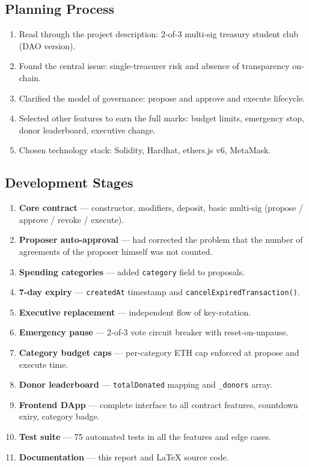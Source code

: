 \documentclass[12pt,a4paper]{article}
\begin{document}
\subsection{Planning Process}

\begin{enumerate}
  \item Read through the project description: 2-of-3 multi-sig treasury student club (DAO version).
  \item Found the central issue: single-treasurer risk and absence of transparency on-chain.
  \item Clarified the model of governance: propose and approve and execute lifecycle.
  \item Selected other features to earn the full marks: budget limits, emergency stop, donor leaderboard, executive change.
  \item Chosen technology stack: Solidity, Hardhat, ethers.js v6, MetaMask.
\end{enumerate}

\subsection{Development Stages}

\begin{enumerate}
  \item \textbf{Core contract} — constructor, modifiers, deposit, basic multi-sig (propose / approve / revoke / execute).
  \item \textbf{Proposer auto-approval} — had corrected the problem that the number of agreements of the proposer himself was not counted.
  \item \textbf{Spending categories} — added \texttt{category} field to proposals.
  \item \textbf{7-day expiry} — \texttt{createdAt} timestamp and \texttt{cancelExpiredTransaction()}.
  \item \textbf{Executive replacement} — independent flow of key-rotation.
  \item \textbf{Emergency pause} — 2-of-3 vote circuit breaker with reset-on-unpause.
  \item \textbf{Category budget caps} — per-category ETH cap enforced at propose and execute time.
  \item \textbf{Donor leaderboard} — \texttt{totalDonated} mapping and \texttt{\_donors} array.
  \item \textbf{Frontend DApp} — complete interface to all contract features, countdown exiry, category badge.
  \item \textbf{Test suite} —  75 automated tests in all the features and edge cases.
  \item \textbf{Documentation} — this report and LaTeX source code.
\end{enumerate}
\end{document}
